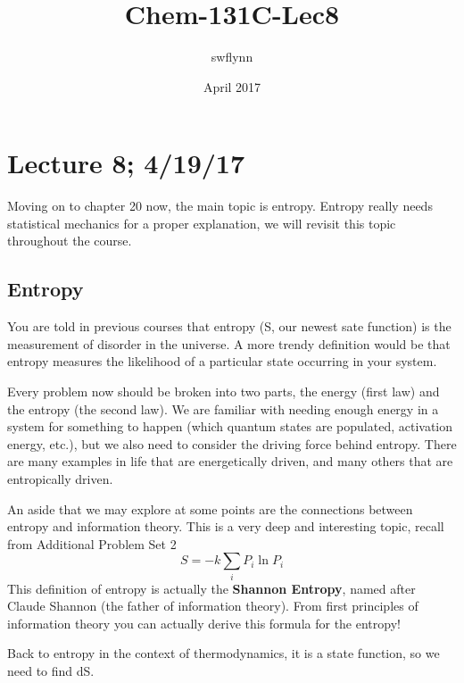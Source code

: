 \documentclass{article}
\title{Chem-131C-Lec8}
\author{swflynn }
\date{April 2017}
\begin{document}
\maketitle

\section*{Lecture 8; 4/19/17}
Moving on to chapter 20 now, the main topic is entropy. 
Entropy really needs statistical mechanics for a proper explanation, we will revisit this topic throughout the course. 

\subsection*{Entropy}
You are told in previous courses that entropy (S, our newest sate function) is the measurement of disorder in the universe. 
A more trendy definition would be that entropy measures the likelihood of a particular state occurring in your system. 

Every problem now should be broken into two parts, the energy (first law) and the entropy (the second law). 
We are familiar with needing enough energy in a system for something to happen (which quantum states are populated, activation energy, etc.), but we also need to consider the driving force behind entropy. 
There are many examples in life that are energetically driven, and many others that are entropically driven. 

An aside that we may explore at some points are the connections between entropy and information theory. 
This is a very deep and interesting topic, recall from Additional Problem Set 2
\begin{equation}
    S = -k\sum_i P_i \ln P_i
\end{equation}
This definition of entropy is actually the \textbf{Shannon Entropy}, named after Claude Shannon (the father of information theory).
From first principles of information theory you can actually derive this formula for the entropy!

Back to entropy in the context of thermodynamics, it is a state function, so we need to find dS. 
\end{document}
